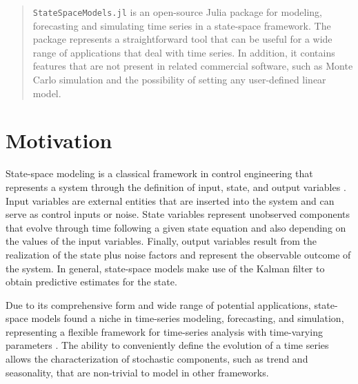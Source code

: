 \documentclass{juliacon}
\begin{document}


\maketitle

\begin{abstract}

\small{\texttt{StateSpaceModels.jl}} is an open-source Julia package for modeling, forecasting and simulating time series in a state-space framework. The package represents a straightforward tool that can be useful for a wide range of applications that deal with time series. In addition, it contains features that are not present in related commercial software, such as Monte Carlo simulation and the possibility of setting any user-defined linear model.

\end{abstract}

\section{Motivation} \label{sec:introduction}

State-space modeling is a classical framework in control engineering that represents a system through the definition of input, state, and output variables \cite{zadeh2008linear}. Input variables are external entities that are inserted into the system and can serve as control inputs or noise. State variables represent unobserved components that evolve through time following a given state equation and also depending on the values of the input variables. Finally, output variables result from the realization of the state plus noise factors and represent the observable outcome of the system. In general, state-space models make use of the Kalman filter \cite{kalman1960new, welch1995introduction} to obtain predictive estimates for the state.

Due to its comprehensive form and wide range of potential applications, state-space models found a niche in time-series modeling, forecasting, and simulation, representing a flexible framework for time-series analysis with time-varying parameters \cite{durbin2012time}. The ability to conveniently define the evolution of a time series allows the characterization of stochastic components, such as trend and seasonality, that are non-trivial to model in other frameworks.
\end{document}
